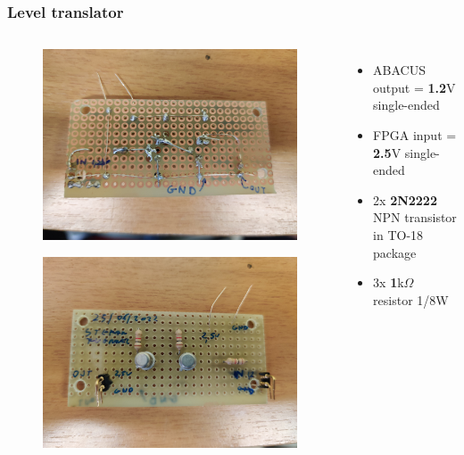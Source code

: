 \documentclass[aspectratio=169]{beamer}
\begin{document}
	\begin{frame}
	\frametitle{Level translator}
	\begin{columns}
		\begin{center}
			\begin{figure}
				\includegraphics[width=0.8 \textwidth]{IMG/level_translator_back-min.jpg}
			\end{figure}
			\begin{figure}
				\includegraphics[width=0.8 \textwidth]{IMG/level_translator_front-min.jpg}
			\end{figure}
		\end{center}
		\begin{itemize}
			\item ABACUS output = \textbf{1.2}V single-ended
			\item FPGA input = \textbf{2.5}V single-ended
			\item 2x \textbf{2N2222} NPN transistor in TO-18 package
			\item 3x \textbf{1}k$\Omega$ resistor 1/8W

\end{itemize}
\end{columns}
\end{frame}
\end{document}

